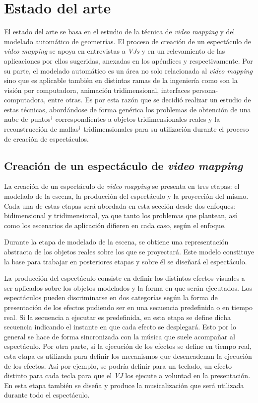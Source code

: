 \chapter{Estado del arte}

El estado del arte se basa en el estudio de la técnica de \emph{video mapping} y del modelado automático de geometrías.
El proceso de creación de un espectáculo de \emph{video mapping} se apoya en entrevistas a \emph{VJs} y en un relevamiento de las aplicaciones por ellos sugeridas, anexadas en los apéndices  y  respectivamente.
Por su parte, el modelado automático es un área no solo relacionada al \emph{video mapping} sino que es aplicable también en distintas ramas de la ingeniería como son la visión por computadora, animación tridimensional, interfaces persona-computadora, entre otras. Es por esta razón que se decidió realizar un estudio de estas técnicas, abordándose de forma genérica los problemas de obtención de una nube de puntos$^\dagger$ correspondientes a objetos tridimensionales reales y la reconstrucción de mallas$^\dagger$ tridimensionales para su utilización durante el proceso de creación de espectáculos.

\section{Creación de un espectáculo de \emph{video mapping}}

La creación de un espectáculo de \emph{video mapping} se presenta en tres etapas: el modelado de la escena, la producción del espectáculo y la proyección del mismo.
Cada una de estas etapas será abordada en esta sección desde dos enfoques: bidimensional y tridimensional, ya que tanto los problemas que plantean, así como los escenarios de aplicación difieren en cada caso, según el enfoque.

Durante la etapa de modelado de la escena, se obtiene una representación abstracta de los objetos reales sobre los que se proyectará. Este modelo constituye la base para trabajar en posteriores etapas y sobre él se diseñará el espectáculo.

La producción del espectáculo consiste en definir los distintos efectos visuales a ser aplicados sobre los objetos modelados y la forma en que serán ejecutados. Los espectáculos pueden discriminarse en dos categorías según la forma de presentación de los efectos pudiendo ser en una secuencia predefinida o en tiempo real.
Si la secuencia a ejecutar es predefinida, en esta etapa se define dicha secuencia indicando el instante en que cada efecto se desplegará. Esto por lo general se hace de forma sincronizada con la música que suele acompañar al espectáculo. Por otra parte, si la ejecución de los efectos se define en tiempo real, esta etapa es utilizada para definir los mecanismos que desencadenan la ejecución de los efectos. Así por ejemplo, se podría definir para un teclado, un efecto distinto para cada tecla para que el \emph{VJ} los ejecute a voluntad en la presentación.
En esta etapa también se diseña y produce la musicalización que será utilizada durante todo el espectáculo.


